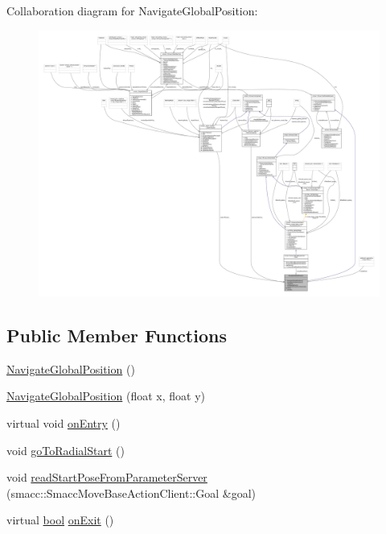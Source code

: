 Collaboration diagram for Navigate\+Global\+Position\+:
\nopagebreak
\begin{figure}[H]
\begin{center}
\leavevmode
\includegraphics[width=350pt]{classNavigateGlobalPosition__coll__graph}
\end{center}
\end{figure}
\subsection*{Public Member Functions}
\begin{DoxyCompactItemize}
\item 
\hyperlink{classNavigateGlobalPosition_a9d689608937eb75fe747be14acfab57d}{Navigate\+Global\+Position} ()
\item 
\hyperlink{classNavigateGlobalPosition_a60ea1910d8d317fa0af83554aee56dde}{Navigate\+Global\+Position} (float x, float y)
\item 
virtual void \hyperlink{classNavigateGlobalPosition_a80962ce5bba51285565e360872f58c47}{on\+Entry} ()
\item 
void \hyperlink{classNavigateGlobalPosition_a5181e70601da336334f25a95840fd878}{go\+To\+Radial\+Start} ()
\item 
void \hyperlink{classNavigateGlobalPosition_a7f59ee188413d4f4b006549ba6d3d3f8}{read\+Start\+Pose\+From\+Parameter\+Server} (smacc\+::\+Smacc\+Move\+Base\+Action\+Client\+::\+Goal \&goal)
\item 
virtual \hyperlink{classbool}{bool} \hyperlink{classNavigateGlobalPosition_aa5e17638bdf3944631e81d901632bb72}{on\+Exit} ()
\end{DoxyCompactItemize}

